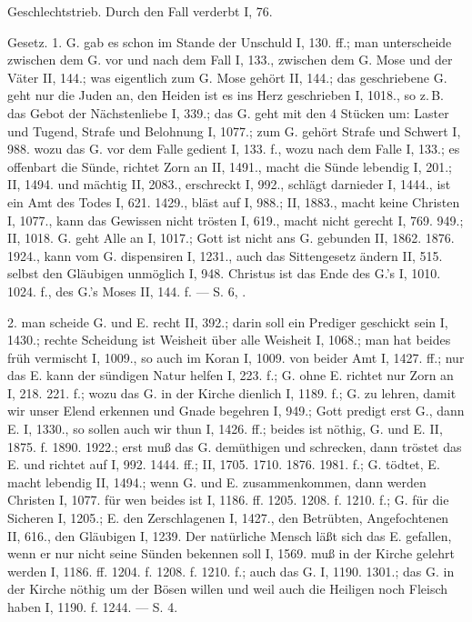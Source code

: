 Geschlechtstrieb. Durch den Fall verderbt I, 76.

Gesetz. 1.  G. gab es schon im Stande der Unschuld I, 130. ff.; man unterscheide zwischen dem G. vor und nach dem Fall I, 133., zwischen dem G. Mose und der Väter II, 144.; was eigentlich zum G. Mose gehört II, 144.; das geschriebene G. geht nur die Juden an, den Heiden ist es ins Herz geschrieben I, 1018., so z.\,B. das Gebot der Nächstenliebe I, 339.; das G. geht mit den 4 Stücken um: Laster und Tugend, Strafe und Belohnung I, 1077.; zum G. gehört Strafe und Schwert I, 988.  wozu das G. vor dem Falle gedient I, 133. f., wozu nach dem Falle I, 133.; es offenbart die Sünde, richtet Zorn an II, 1491., macht die Sünde lebendig I, 201.; II, 1494. und mächtig II, 2083., erschreckt I, 992., schlägt darnieder I, 1444., ist ein Amt des Todes I, 621. 1429., bläst auf I, 988.; II, 1883., macht keine Christen I, 1077., kann das Gewissen nicht trösten I, 619., macht nicht gerecht I, 769. 949.; II, 1018.  G. geht Alle an I, 1017.; Gott ist nicht ans G. gebunden II, 1862. 1876. 1924., kann vom G. dispensiren I, 1231., auch das Sittengesetz ändern II, 515.  selbst den Gläubigen unmöglich I, 948.  Christus ist das Ende des G.’s I, 1010. 1024. f., des G.’s Moses II, 144. f. — S.  6, .

2.  man scheide G. und E. recht II, 392.; darin soll ein Prediger geschickt sein I, 1430.; rechte Scheidung ist Weisheit über alle Weisheit I, 1068.; man hat beides früh vermischt I, 1009., so auch im Koran I, 1009.  von beider Amt I, 1427. ff.; nur das E. kann der sündigen Natur helfen I, 223. f.; G. ohne E. richtet nur Zorn an I, 218. 221. f.; wozu das G. in der Kirche dienlich I, 1189. f.; G. zu lehren, damit wir unser Elend erkennen und Gnade begehren I, 949.; Gott predigt erst G., dann E. I, 1330., so sollen auch wir thun I, 1426. ff.; beides ist nöthig, G. und E. II, 1875. f. 1890. 1922.; erst muß das G. demüthigen und schrecken, dann tröstet das E. und richtet auf I, 992. 1444. ff.; II, 1705. 1710. 1876. 1981. f.; G. tödtet, E. macht lebendig II, 1494.; wenn G. und E. zusammenkommen, dann werden Christen I, 1077.  für wen beides ist I, 1186. ff. 1205. 1208. f. 1210. f.; G. für die Sicheren I, 1205.; E. den Zerschlagenen I, 1427., den Betrübten, Angefochtenen II, 616., den Gläubigen I, 1239. Der natürliche Mensch läßt sich das E. gefallen, wenn er nur nicht seine Sünden bekennen soll I, 1569.  muß in der Kirche gelehrt werden I, 1186. ff. 1204. f. 1208. f. 1210. f.; auch das G. I, 1190. 1301.; das G. in der Kirche nöthig um der Bösen willen und weil auch die Heiligen noch Fleisch haben I, 1190. f. 1244. — S.  4.

